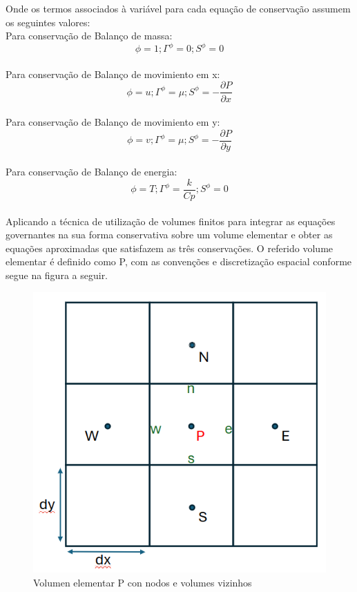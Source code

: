 \documentclass[]{article}
\begin{document}
Onde os termos associados à variável para cada equação de conservação assumem os seguintes valores:\\
Para conservação de Balanço de massa: 
\begin{equation*}
		\phi = 1 ; \varGamma^{\phi} = 0 ; S^{\phi} = 0 
\end{equation*}\\
Para conservação de Balanço de movimiento em x: 
\begin{equation*}
	\phi = u ; \varGamma^{\phi} = \mu ; S^{\phi} =  -\frac{\partial P}{\partial x}
\end{equation*}\\
Para conservação de Balanço de movimiento em y: 
\begin{equation*}
	\phi = v ; \varGamma^{\phi} = \mu ; S^{\phi} =  -\frac{\partial P}{\partial y}
\end{equation*}\\
Para conservação de Balanço de energia: 
\begin{equation*}
	\phi = T ; \varGamma^{\phi} = \frac{k}{Cp} ; S^{\phi} =  0
\end{equation*}\\

Aplicando a técnica de utilização de volumes finitos para integrar as equações governantes na sua forma conservativa sobre um volume elementar e obter as equações aproximadas que satisfazem as três conservações. O referido volume elementar é definido como P, com as convenções e discretização espacial conforme segue na figura a seguir.

\begin{figure}[H]
	\centering
	\includegraphics[width=.65\textwidth]{figures/1}
	\caption{Volumen elementar P con nodos e volumes vizinhos}
\end{figure}
\end{document}
